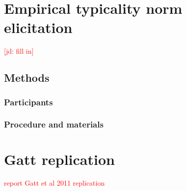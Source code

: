 \documentclass[11pt]{article}
\newcommand{\red}[1]{\textcolor{Red}{#1}}
\newcommand{\jd}[1]{\textcolor{Red}{[jd: #1]}}
\newcommand{\figref}[1]{Figure \ref{#1}}
\begin{document}
%
%

\section{Empirical typicality norm elicitation}
\label{app:typicalityexperiment}

\jd{fill in}

\subsection{Methods}

\subsubsection{Participants}

\subsubsection{Procedure and materials}



\section{Gatt replication}
\red{report Gatt et al 2011 replication}



\setlength{\bibleftmargin}{.125in}
\setlength{\bibindent}{-\bibleftmargin}


\end{document}
